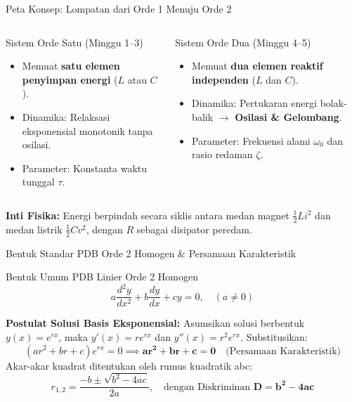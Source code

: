 \documentclass[aspectratio=169,10pt]{beamer}
\begin{document}
\begin{frame}{Peta Konsep: Lompatan dari Orde 1 Menuju Orde 2}
  \begin{columns}[c]
    \begin{block}{Sistem Orde Satu (Minggu 1--3)}
      \begin{itemize}
        \item Memuat \textbf{satu elemen penyimpan energi} ($L$ atau $C$).
        \item Dinamika: Relaksasi eksponensial monotonik tanpa osilasi.
        \item Parameter: Konstanta waktu tunggal $\tau$.
      \end{itemize}
    \end{block}

    \begin{exampleblock}{Sistem Orde Dua (Minggu 4--5)}
      \begin{itemize}
        \item Memuat \textbf{dua elemen reaktif independen} ($L$ dan $C$).
        \item Dinamika: Pertukaran energi bolak-balik $\rightarrow$ \textbf{Osilasi \& Gelombang}.
        \item Parameter: Frekuensi alami $\omega_0$ dan rasio redaman $\zeta$.
      \end{itemize}
    \end{exampleblock}
  \end{columns}
  \vspace{0.2cm}
  \begin{center}
    \small \textbf{Inti Fisika:} Energi berpindah secara siklis antara medan magnet $\frac{1}{2}Li^2$ dan medan listrik $\frac{1}{2}Cv^2$, dengan $R$ sebagai disipator peredam.
  \end{center}
\end{frame}

\begin{frame}{Bentuk Standar PDB Orde 2 Homogen \& Persamaan Karakteristik}
  \begin{block}{Bentuk Umum PDB Linier Orde 2 Homogen}
    \begin{equation}
      a \frac{d^2 y}{dx^2} + b \frac{dy}{dx} + c y = 0, \quad (a \neq 0)
    \end{equation}
  \end{block}
  \textbf{Postulat Solusi Basis Eksponensial:}
  Asumsikan solusi berbentuk $y(x) = e^{rx}$, maka $y'(x) = r e^{rx}$ dan $y''(x) = r^2 e^{rx}$. Substitusikan:
  \begin{equation*}
    (a r^2 + b r + c) e^{rx} = 0 \implies \mathbf{a r^2 + b r + c = 0} \quad \text{(Persamaan Karakteristik)}
  \end{equation*}
  Akar-akar kuadrat ditentukan oleh rumus kuadratik abc:
  \begin{equation}
    r_{1,2} = \frac{-b \pm \sqrt{b^2 - 4ac}}{2a}, \quad \text{dengan Diskriminan } \mathbf{D = b^2 - 4ac}
  \end{equation}
\end{frame}
\end{document}
